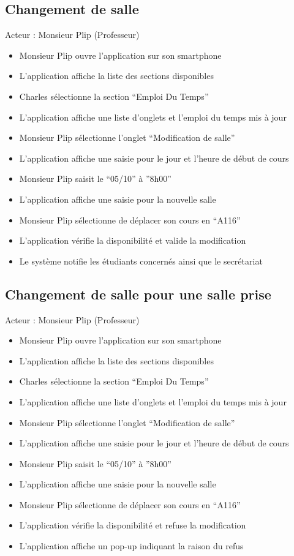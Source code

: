 \subsection*{Changement de salle}
Acteur : Monsieur Plip (Professeur)
\begin{itemize}
\item Monsieur Plip ouvre l’application sur son smartphone 
\item L’application affiche la liste des sections disponibles 
\item Charles sélectionne la section “Emploi Du Temps” 
\item L’application affiche une liste d’onglets et l’emploi du temps mis à jour 
\item Monsieur Plip sélectionne l’onglet “Modification de salle” 
\item L’application affiche une saisie pour le jour et l’heure de début de cours 
\item Monsieur Plip saisit le “05/10” à ”8h00” 
\item L’application affiche une saisie pour la nouvelle salle 
\item Monsieur Plip sélectionne de déplacer son cours en “A116” 
\item L’application vérifie la disponibilité et valide la modification 
\item Le système notifie les étudiants concernés ainsi que le secrétariat 
\end{itemize}

\subsection*{Changement de salle pour une salle prise}
Acteur : Monsieur Plip (Professeur)
\begin{itemize}
\item Monsieur Plip ouvre l’application sur son smartphone 
\item L’application affiche la liste des sections disponibles 
\item Charles sélectionne la section “Emploi Du Temps” 
\item L’application affiche une liste d’onglets et l’emploi du temps mis à jour 
\item Monsieur Plip sélectionne l’onglet “Modification de salle” 
\item L’application affiche une saisie pour le jour et l’heure de début de cours 
\item Monsieur Plip saisit le “05/10” à ”8h00” 
\item L’application affiche une saisie pour la nouvelle salle 
\item Monsieur Plip sélectionne de déplacer son cours en “A116” 
\item L’application vérifie la disponibilité et refuse la modification 
\item L’application affiche un pop-up indiquant la raison du refus 
\end{itemize}

